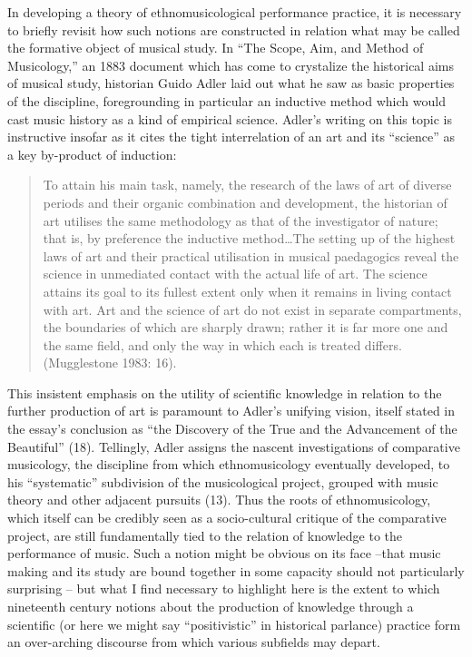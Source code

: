 In developing a theory of ethnomusicological performance practice, it is
necessary to briefly revisit how such notions are constructed in
relation what may be called the formative object of musical study. In
``The Scope, Aim, and Method of Musicology,'' an 1883 document which has
come to crystalize the historical aims of musical study, historian Guido
Adler laid out what he saw as basic properties of the discipline,
foregrounding in particular an inductive method which would cast music
history as a kind of empirical science. Adler's writing on this topic is
instructive insofar as it cites the tight interrelation of an art and
its ``science'' as a key by-product of induction:

\begin{quote}
To attain his main task, namely, the research of the laws of art of
diverse periods and their organic combination and development, the
historian of art utilises the same methodology as that of the
investigator of nature; that is, by preference the inductive
method\ldots The setting up of the highest laws of art and their
practical utilisation in musical paedagogics reveal the science in
unmediated contact with the actual life of art. The science attains its
goal to its fullest extent only when it remains in living contact with
art. Art and the science of art do not exist in separate compartments,
the boundaries of which are sharply drawn; rather it is far more one and
the same field, and only the way in which each is treated differs.
(Mugglestone 1983: 16).
\end{quote}

This insistent emphasis on the utility of scientific knowledge in
relation to the further production of art is paramount to Adler's
unifying vision, itself stated in the essay's conclusion as ``the
Discovery of the True and the Advancement of the Beautiful'' (18).
Tellingly, Adler assigns the nascent investigations of comparative
musicology, the discipline from which ethnomusicology eventually
developed, to his ``systematic'' subdivision of the musicological
project, grouped with music theory and other adjacent pursuits (13).
Thus the roots of ethnomusicology, which itself can be credibly seen as
a socio-cultural critique of the comparative project, are still
fundamentally tied to the relation of knowledge to the performance of
music. Such a notion might be obvious on its face --that music making
and its study are bound together in some capacity should not
particularly surprising -- but what I find necessary to highlight here
is the extent to which nineteenth century notions about the production
of knowledge through a scientific (or here we might say ``positivistic''
in historical parlance) practice form an over-arching discourse from
which various subfields may depart.

